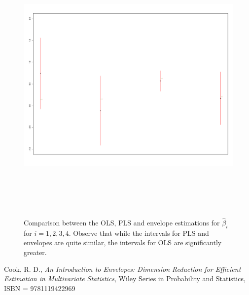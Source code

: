 \documentclass{article}
\theoremstyle{definition}
\begin{document}
\begin{figure}[h!]
	\centering
	\includegraphics[width=18cm,height=14cm]{CIbetas.pdf}
	\caption{Comparison between the OLS, PLS and envelope estimations for $\widehat{\beta}_i$ for $i=1,2,3,4$. Observe that while the intervals for PLS and envelopes are quite similar, the intervals for OLS are significantly greater.}
	\label{fig:4}
\end{figure}
\newpage
\begin{thebibliography}{9}
Cook, R. D., \textit{An Introduction to Envelopes: Dimension Reduction for Efficient Estimation in Multivariate Statistics}, Wiley Series in Probability and Statistics, ISBN = 9781119422969
\end{thebibliography}
\end{document}
